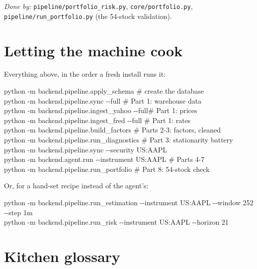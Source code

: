 \documentclass[11pt,a4paper]{article}
\newcommand{\doneby}[1]{\par{\raggedright\small\textit{Done by:} #1\par}}
\begin{document}
\doneby{\texttt{pipeline/portfolio\_risk.py}, \texttt{core/portfolio.py}, \texttt{pipeline/run\_portfolio.py} (the 54-stock validation).}

\appendix
\renewcommand{\thesection}{\Alph{section}}
\titleformat{\section}{\sffamily\Large\bfseries\color{navy}}{Appendix \thesection}{0.8em}{}

\section{Letting the machine cook}

Everything above, in the order a fresh install runs it:

\begin{code}
python -m backend.pipeline.apply\_schema       \# create the database\\
python -m backend.pipeline.sync -{}-full        \# Part 1: warehouse data\\
python -m backend.pipeline.ingest\_yahoo -{}-full\# Part 1: prices\\
python -m backend.pipeline.ingest\_fred -{}-full \# Part 1: rates\\
python -m backend.pipeline.build\_factors      \# Parts 2-3: factors, cleaned\\
python -m backend.pipeline.run\_diagnostics    \# Part 3: stationarity battery\\
python -m backend.pipeline.sync -{}-security US:AAPL\\
python -m backend.agent.run -{}-instrument US:AAPL  \# Parts 4-7\\
python -m backend.pipeline.run\_portfolio      \# Part 8: 54-stock check
\end{code}

Or, for a hand-set recipe instead of the agent's:

\begin{code}
python -m backend.pipeline.run\_estimation -{}-instrument US:AAPL -{}-window 252 -{}-step 1m\\
python -m backend.pipeline.run\_risk -{}-instrument US:AAPL -{}-horizon 21
\end{code}

\section{Kitchen glossary}
\end{document}
